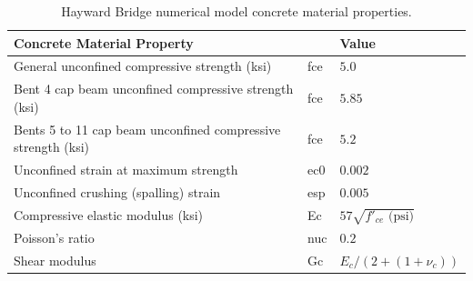 \begin{table}[H]
\centering
\begin{tabular}{lll}
\toprule
\multicolumn{2}{l}{\textbf{Concrete Material Property}}                       & \textbf{Value} \\ 
\midrule
General unconfined compressive strength                  (ksi) & \gls{fce} & $5.0$   \\
Bent 4 cap beam unconfined compressive strength          (ksi) & \gls{fce} & $5.85$  \\
Bents 5 to 11 cap beam unconfined   compressive strength (ksi) & \gls{fce} & $5.2$   \\
Unconfined strain at maximum strength                          & \gls{ec0} & $0.002$ \\
Unconfined crushing (spalling) strain                          & \gls{esp} & $0.005$ \\
Compressive elastic modulus                              (ksi) & \gls{Ec}  & $57\sqrt{f'_{ce} \text{ (psi)}}$ \\
Poisson's ratio                                                & \gls{nuc} & $0.2$   \\
Shear modulus                                                  & \gls{Gc}  & $E_{c}/\left(2+(1+\nu_{c})\right)$ \\ 
\bottomrule
\end{tabular}
\caption{Hayward Bridge numerical model concrete material properties.}
\label{tab:num:concrete}
\end{table}

